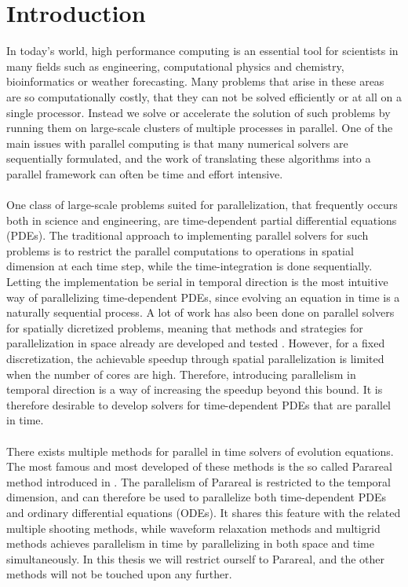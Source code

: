 \chapter{Introduction}
In today’s world, high performance computing is an essential tool for scientists in many fields such as engineering, computational physics and chemistry, bioinformatics or weather forecasting. Many problems that arise in these areas are so computationally costly, that they can not be solved efficiently or at all on a single processor. Instead we solve or accelerate the solution of such problems by running them on large-scale clusters of multiple processes in parallel. One of the main issues with parallel computing is that many numerical solvers are sequentially formulated, and the work of translating these algorithms into a parallel framework can often be time and effort intensive.
\\
\\
One class of large-scale problems suited for parallelization, that frequently occurs both in science and engineering, are time-dependent partial differential equations (PDEs). The traditional approach to implementing parallel solvers for such problems is to restrict the parallel computations to operations in spatial dimension at each time step, while the time-integration is done sequentially. Letting the implementation be serial in temporal direction is the most intuitive way of parallelizing time-dependent PDEs, since evolving an equation in time is a naturally sequential process. A lot of work has also been done on parallel solvers for spatially dicretized problems, meaning that methods and strategies for parallelization in space already are developed and tested \cite{elman2014finite}. However, for a fixed discretization, the achievable speedup through spatial parallelization is limited when the number of cores are high. Therefore, introducing parallelism in temporal direction is a way of increasing the speedup beyond this bound. It is therefore desirable to develop solvers for time-dependent PDEs that are parallel in time.
\\
\\
There exists multiple methods for parallel in time solvers of evolution equations. The most famous and most developed of these methods is the so called Parareal method introduced in \cite{lions2001resolution}. The parallelism of Parareal is restricted to the temporal dimension, and can therefore be used to parallelize both time-dependent PDEs and ordinary differential equations (ODEs). It shares this feature with the related multiple shooting methods\cite{nievergelt1964parallel,bellen1989parallel}, while waveform relaxation methods\cite{lelarasmee1982waveform,gander1996overlapping} and multigrid methods\cite{hackbusch1985parabolic,lubich1987multi,horton1995space} achieves parallelism in time by parallelizing in both space and time simultaneously. In this thesis we will restrict ourself to Parareal, and the other methods will not be touched upon any further.
